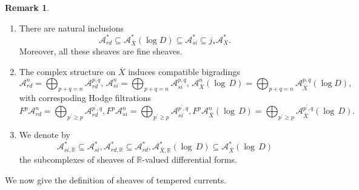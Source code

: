 \documentclass[11pt, a4paper]{amsart}
\theoremstyle{plain}
\theoremstyle{definition}
\newtheorem{remark}[theorem]{Remark}
\numberwithin{equation}{section}
\def\RR{\mathbb{R}}
\begin{document}
\begin{remark}
    \begin{enumerate}
        \item There are natural inclusions 
        \begin{equation*}
            \mathcal{A}_{rd}^{*} \subseteq \mathcal{A}_{\overline{X}}^{*}(\log D) \subseteq \mathcal{A}_{si}^{*} \subseteq j_{*} \mathcal{A}^{*}_{X}. 
        \end{equation*}
        Moreover, all these sheaves are fine sheaves. 
        \item The complex structure on $\overline{X}$ induces compatible bigradings
        \begin{equation*}
            \mathcal{A}_{rd}^{n} = \bigoplus_{p + q = n} \mathcal{A}_{rd}^{p,q}, \,  \mathcal{A}_{si}^{n} = \bigoplus_{p + q = n} \mathcal{A}_{si}^{p,q}, \, \mathcal{A}_{\overline{X}}^{n}(\log \, D) = \bigoplus_{p + q = n} \mathcal{A}_{\overline{X}}^{p, q}(\log D), 
        \end{equation*}
        with correspoding Hodge filtrations 
        \begin{equation*}
            F^{p}\mathcal{A}_{rd}^{n} = \bigoplus_{p^{\prime} \ge p} \mathcal{A}_{rd}^{p^{\prime},q}, F^{p}\mathcal{A}_{si}^{n} = \bigoplus_{p^{\prime} \ge p} \mathcal{A}_{si}^{p^{\prime},q}, 
            F^{p}\mathcal{A}_{\overline{X}}^{n} (\log \, D) = \bigoplus_{p^{\prime} \ge p} \mathcal{A}_{\overline{X}}^{p^{\prime}, q} (\log \, D). 
        \end{equation*}
        \item We denote by 
        \begin{equation*}
            \mathcal{A}_{si, \RR}^{*} \subseteq \mathcal{A}_{si}^{*},  \mathcal{A}_{rd, \RR}^{*} \subseteq \mathcal{A}_{rd}^{*}, \mathcal{A}_{\overline{X}, \RR}^{*}(\log \, D) \subseteq \mathcal{A}_{\overline{X}}^{*}(\log \, D)
        \end{equation*}
        the subcomplexes of sheaves of $\RR$-valued differential forms. 
    \end{enumerate}
\end{remark}

    We now give the definition of sheaves of tempered currents. 
\end{document}
